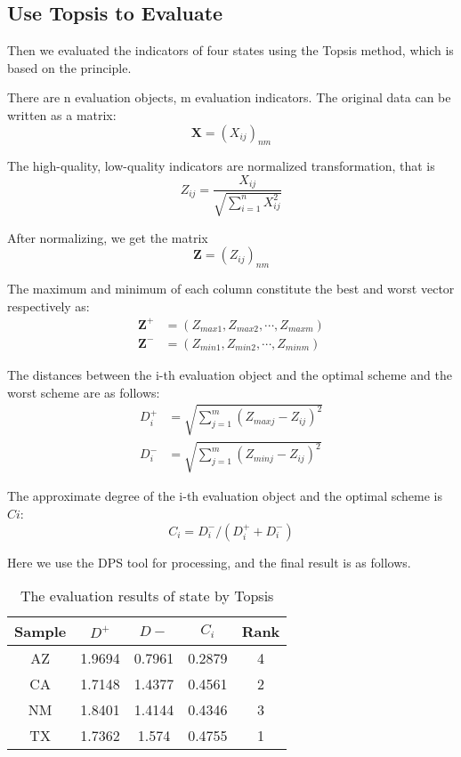 \documentclass{mcmthesis}
\begin{document}
\subsection{Use Topsis to Evaluate}
Then we evaluated the indicators of four states using the Topsis method, which is based on the principle\cite{wikitopsis}.

There are n evaluation objects, m evaluation indicators. The original data can be written as a matrix:
\begin{equation}
  \mathbf{X} = (X_{ij})_{nm} 
\end{equation}

The high-quality, low-quality indicators are normalized transformation, that is
\begin{equation}
  Z_{ij} = \frac{X_{ij}}{\sqrt{\sum\limits_{i=1}^{n}X_{ij}^2}}
\end{equation}

After normalizing, we get the matrix
\begin{equation}
  \mathbf{Z} = (Z_{ij})_{nm}
\end{equation}

The maximum and minimum of each column constitute the best and worst vector respectively as:
\begin{align}
  \mathbf{Z^+} &= (Z_{max1}, Z_{max2}, \cdots, Z_{maxm})   \\
  \mathbf{Z^-} &= (Z_{min1}, Z_{min2}, \cdots, Z_{minm})
\end{align}

The distances between the i-th evaluation object and the optimal scheme and the worst scheme are as follows:
\begin{align}
   D_i^+ &= \sqrt{ \sum\limits_{j=1}^m (Z_{maxj} - Z_{ij})^2 } \\
   D_i^- &= \sqrt{ \sum\limits_{j=1}^m (Z_{minj} - Z_{ij})^2 }
\end{align}

The approximate degree of the i-th evaluation object and the optimal scheme is $Ci$:
\begin{equation}
  C_i = D_i^- / (D_i^+ + D_i^-)
\end{equation}

Here we use the DPS tool for processing, and the final result is as follows.
\begin{table}[H]
\centering
\caption{The evaluation results of state by Topsis}
\label{Topsis}
\begin{tabular}{|c|c|c|c|c|}
\hline
Sample & $D^+$     & $D-$     & $C_i$     & Rank \\ \hline
AZ     & 1.9694 & 0.7961 & 0.2879 & 4    \\ \hline
CA     & 1.7148 & 1.4377 & 0.4561 & 2    \\ \hline
NM     & 1.8401 & 1.4144 & 0.4346 & 3    \\ \hline
TX     & 1.7362 & 1.574  & 0.4755 & 1    \\ \hline
\end{tabular}
\end{table}
\end{document}
